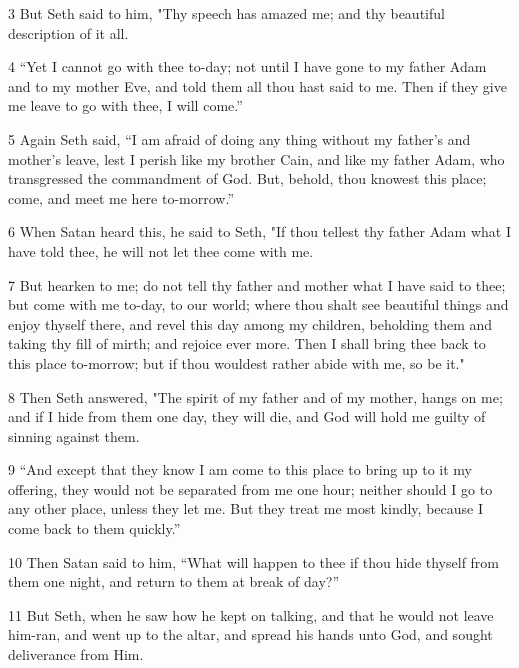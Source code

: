 \par 3 But Seth said to him, "Thy speech has amazed me; and thy beautiful description of it all.

\par 4 “Yet I cannot go with thee to-day; not until I have gone to my father Adam and to my mother Eve, and told them all thou hast said to me. Then if they give me leave to go with thee, I will come.”

\par 5 Again Seth said, “I am afraid of doing any thing without my father's and mother's leave, lest I perish like my brother Cain, and like my father Adam, who transgressed the commandment of God. But, behold, thou knowest this place; come, and meet me here to-morrow.”

\par 6 When Satan heard this, he said to Seth, "If thou tellest thy father Adam what I have told thee, he will not let thee come with me.

\par 7 But hearken to me; do not tell thy father and mother what I have said to thee; but come with me to-day, to our world; where thou shalt see beautiful things and enjoy thyself there, and revel this day among my children, beholding them and taking thy fill of mirth; and rejoice ever more. Then I shall bring thee back to this place to-morrow; but if thou wouldest rather abide with me, so be it."

\par 8 Then Seth answered, "The spirit of my father and of my mother, hangs on me; and if I hide from them one day, they will die, and God will hold me guilty of sinning against them.

\par 9 “And except that they know I am come to this place to bring up to it my offering, they would not be separated from me one hour; neither should I go to any other place, unless they let me. But they treat me most kindly, because I come back to them quickly.”

\par 10 Then Satan said to him, “What will happen to thee if thou hide thyself from them one night, and return to them at break of day?”

\par 11 But Seth, when he saw how he kept on talking, and that he would not leave him-ran, and went up to the altar, and spread his hands unto God, and sought deliverance from Him.

